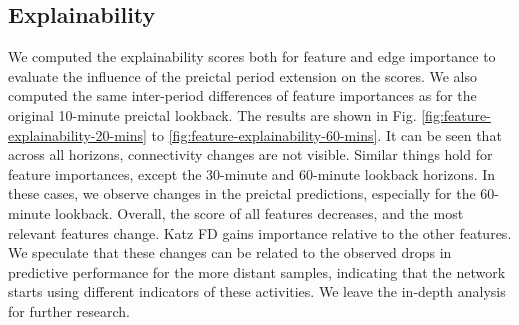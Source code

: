 \documentclass[a4paper,fleqn]{cas-sc}
\begin{document}
\subsection{Explainability}
We computed the explainability scores both for feature and edge importance to evaluate the influence of the preictal period extension on the scores. We also computed the same inter-period differences of feature importances as for the original 10-minute preictal lookback. The results are shown in Fig. \ref{fig:feature-explainability-20-mins} to \ref{fig:feature-explainability-60-mins}. It can be seen that across all horizons, connectivity changes are not visible. Similar things hold for feature importances, except the 30-minute and 60-minute lookback horizons. In these cases, we observe changes in the preictal predictions, especially for the 60-minute lookback. Overall, the score of all features decreases, and the most relevant features change. Katz FD gains importance relative to the other features. We speculate that these changes can be related to the observed drops in predictive performance for the more distant samples, indicating that the network starts using different indicators of these activities. We leave the in-depth analysis for further research.
\end{document}
